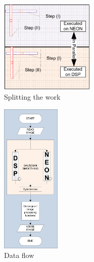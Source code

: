 \begin{figure}
\centering
\includegraphics[width=0.4\textwidth]{drawings/gaussian_balancing}
\caption{Splitting the work}
\label{fig:balancing}
\end{figure}

\begin{figure}
\centering
\includegraphics[width=0.25\textwidth]{drawings/model}
\caption{Data flow}
\label{fig:dataflow}
\end{figure}



